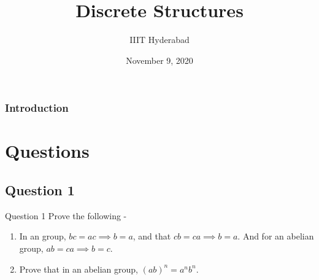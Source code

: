 \documentclass[xcolor=svgnames]{beamer}
\title[Discrete Structures]{Discrete Structures} %
\author{IIIT Hyderabad} %
\institute[] %
{
Monsoon 2020 \\ %
\medskip
\textit{Tutorial 15} %
}
\date{November 9, 2020} %
\begin{document}
\begin{frame}
\titlepage %
\end{frame}

\begin{frame}
\frametitle{Introduction} %
\tableofcontents %
\end{frame}


\section{Questions}

\subsection{Question 1}


\begin{frame}{Question 1}
Prove the following -
\begin{enumerate}
    \item In an group, $bc = ac \implies b = a$, and that $cb = ca \implies b = a$. And for an abelian group, $ab = ca \implies b = c$.
    \item Prove that in an abelian group, $(ab)^n = a^n b^n$.
\end{enumerate}
\end{frame}
\end{document}
